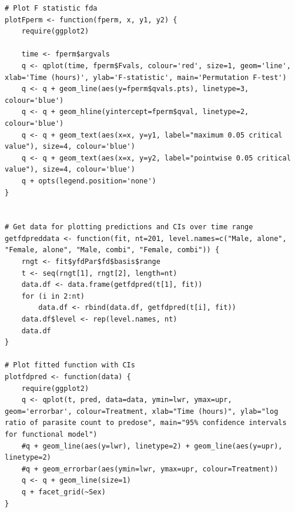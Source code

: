 \begin{singlespace}
\begin{lstlisting}[caption=Functional data analysis plots,label=R:fdaplot]
# Plot F statistic fda
plotFperm <- function(fperm, x, y1, y2) {
	require(ggplot2)
	
	time <- fperm$argvals
	q <- qplot(time, fperm$Fvals, colour='red', size=1, geom='line', xlab='Time (hours)', ylab='F-statistic', main='Permutation F-test')
	q <- q + geom_line(aes(y=fperm$qvals.pts), linetype=3, colour='blue')
	q <- q + geom_hline(yintercept=fperm$qval, linetype=2, colour='blue')
	q <- q + geom_text(aes(x=x, y=y1, label="maximum 0.05 critical value"), size=4, colour='blue')
	q <- q + geom_text(aes(x=x, y=y2, label="pointwise 0.05 critical value"), size=4, colour='blue')
	q + opts(legend.position='none')
}


# Get data for plotting predictions and CIs over time range
getfdpreddata <- function(fit, nt=201, level.names=c("Male, alone", "Female, alone", "Male, combi", "Female, combi")) {
	rngt <- fit$yfdPar$fd$basis$range
	t <- seq(rngt[1], rngt[2], length=nt)
	data.df <- data.frame(getfdpred(t[1], fit))
	for (i in 2:nt)
		data.df <- rbind(data.df, getfdpred(t[i], fit))
	data.df$level <- rep(level.names, nt)
	data.df
}

# Plot fitted function with CIs
plotfdpred <- function(data) {
	require(ggplot2)
	q <- qplot(t, pred, data=data, ymin=lwr, ymax=upr, geom='errorbar', colour=Treatment, xlab="Time (hours)", ylab="log ratio of parasite count to predose", main="95% confidence intervals for functional model")
	#q + geom_line(aes(y=lwr), linetype=2) + geom_line(aes(y=upr), linetype=2)
	#q + geom_errorbar(aes(ymin=lwr, ymax=upr, colour=Treatment))
	q <- q + geom_line(size=1)
	q + facet_grid(~Sex)
}
\end{lstlisting}

\end{singlespace}